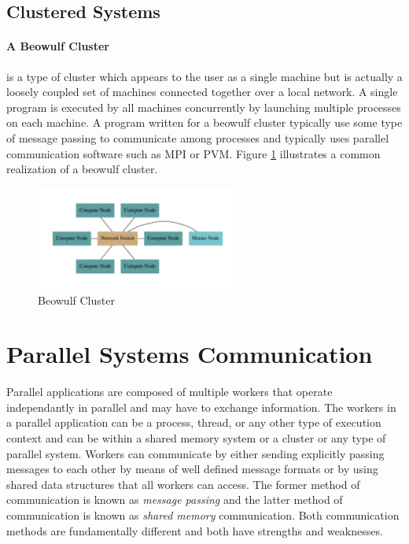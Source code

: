 \documentclass[11pt]{book}
\begin{document}
\subsection{Clustered Systems}

\paragraph{A Beowulf Cluster} is a type of cluster which appears to the user as a single
machine but is actually a loosely coupled set of machines connected together over a local
network.  A single program is executed by all machines concurrently by launching multiple
processes on each machine.  A program written for a beowulf cluster typically use some type
of message passing to communicate among processes and typically uses parallel communication
software such as MPI or PVM.  Figure \ref{beowulf} illustrates a common realization of a beowulf
cluster.

\begin{figure}[H]
    \centering
    \includegraphics[width=0.6\textwidth,quiet]{figs/graphviz/beowulf.pdf}
    \caption{Beowulf Cluster}\label{beowulf}
\end{figure}

\section{Parallel Systems Communication}

Parallel applications are composed of multiple workers that operate independantly in parallel
and may have to exchange information.  The workers in a parallel application can be a process,
thread, or any other type of execution context and can be within a shared memory system or a
cluster or any type of parallel system.  Workers can communicate by either sending explicitly
passing messages to each other by means of well defined message formats or by using shared
data structures that all workers can access.  The former method of communication is known as
\emph{message passing} and the latter method of communication is known as \emph{shared memory}
communication.  Both communication methods are fundamentally different and both have strengths
and weaknesses.
\end{document}
